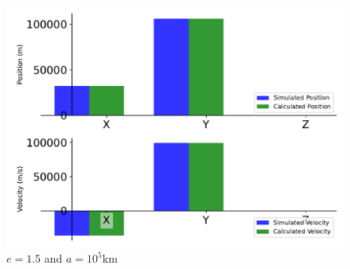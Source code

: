 \begin{figure}[htbp]\centerline{\includegraphics[height=0.7\textwidth, keepaspectratio]{AutoTeX/EquHyp_e_2}}\caption{$e = 1.5$ and $a = 10^5$km}\label{fig:EquHyp_e_2}\end{figure}